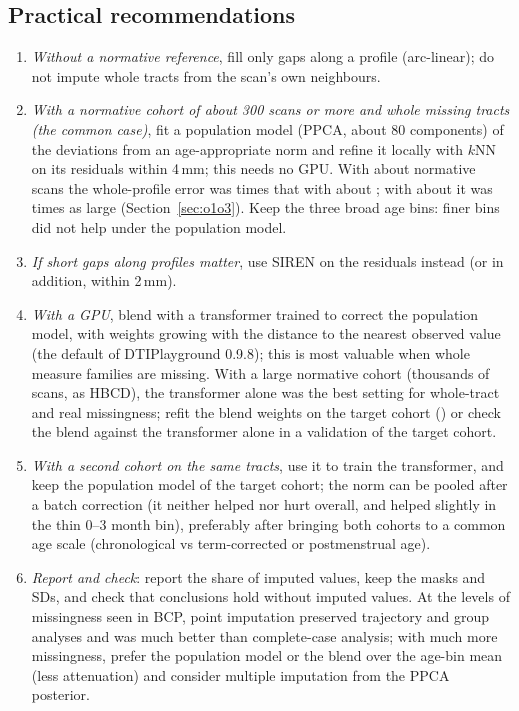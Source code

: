 \documentclass[11pt]{article}
\begin{document}
\subsection{Practical recommendations}

\begin{enumerate}
\item \emph{Without a normative reference}, fill only gaps along a profile (arc-linear); do not impute whole tracts from
the scan's own neighbours.
\item \emph{With a normative cohort of about 300 scans or more and whole missing tracts (the common case)}, fit a
population
model (PPCA, about 80 components) of the deviations from an age-appropriate norm and refine it locally with $k$NN on its
residuals within 4\,mm; this needs no GPU. With about \oNT{} normative scans the whole-profile error was \oPairTKnn{} times that with
about \oNA; with about \oNQ{} it was \oPairQKnn{} times as large (Section~\ref{sec:o1o3}). Keep the three broad age bins: finer bins did not
help under the population model.
\item \emph{If short gaps along profiles matter}, use SIREN on the residuals instead (or in addition, within 2\,mm).
\item \emph{With a GPU}, blend with a transformer trained to correct the population model, with weights growing with the
distance to the nearest observed value (the default of DTIPlayground 0.9.8); this is most valuable when whole measure
families are missing. With a large normative cohort (thousands of scans, as HBCD), the transformer alone was the best setting for
whole-tract and real missingness; refit the blend weights on the target cohort () or
check the blend against the transformer alone in a validation of the target cohort.
\item \emph{With a second cohort on the same tracts}, use it to train the transformer, and keep the population model
of the target cohort; the norm can be pooled after a batch correction (it neither helped nor hurt overall, and helped
slightly in the thin 0--3 month bin), preferably after bringing both cohorts to a common age scale (chronological vs
term-corrected or postmenstrual age).
\item \emph{Report and check}: report the share of imputed values, keep the masks and SDs, and check that conclusions hold
without imputed values. At the levels of missingness seen in BCP, point imputation preserved trajectory and group analyses and was much
better than complete-case analysis; with much more missingness, prefer the population model or the blend over the age-bin
mean (less attenuation) and consider multiple imputation from the PPCA posterior.
\end{enumerate}
\end{document}

